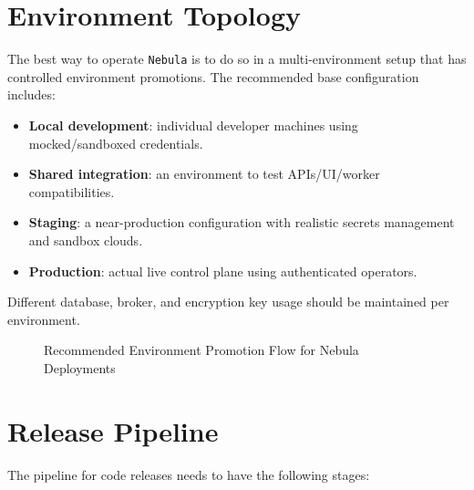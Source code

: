 \section{Environment Topology}
The best way to operate \texttt{Nebula} is to do so in a multi-environment setup that has controlled environment promotions. The recommended base configuration includes:
\begin{itemize}
    \item \textbf{Local development}: individual developer machines using mocked/sandboxed credentials.
    \item \textbf{Shared integration}: an environment to test APIs/UI/worker compatibilities.
    \item \textbf{Staging}: a near-production configuration with realistic secrets management and sandbox clouds.
    \item \textbf{Production}: actual live control plane using authenticated operators.
\end{itemize}

Different database, broker, and encryption key usage should be maintained per environment.

\begin{figure}[H]
\centering
{}
\caption{Recommended Environment Promotion Flow for Nebula Deployments}
\label{fig:environment_promotion}
\end{figure}

\section{Release Pipeline}
The pipeline for code releases needs to have the following stages:

